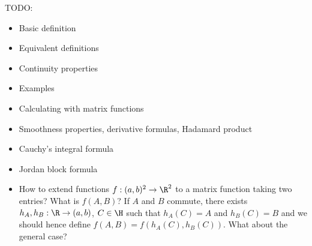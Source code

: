 TODO:
\begin{itemize}
	\item Basic definition
	\item Equivalent definitions
	\item Continuity properties
	\item Examples
	\item Calculating with matrix functions
	\item Smoothness properties, derivative formulas, Hadamard product
	\item Cauchy's integral formula
	\item Jordan block formula
	\item How to extend functions $f : (a, b)^2 \to \R^{2}$ to a matrix function taking two entries? What is $f(A, B)$? If $A$ and $B$ commute, there exists $h_{A}, h_{B} : \R \to (a, b)$, $C \in \H$ such that $h_{A}(C) = A$ and $h_{B}(C) = B$ and we should hence define $f(A, B) = f(h_{A}(C), h_{B}(C))$. What about the general case?
\end{itemize}

